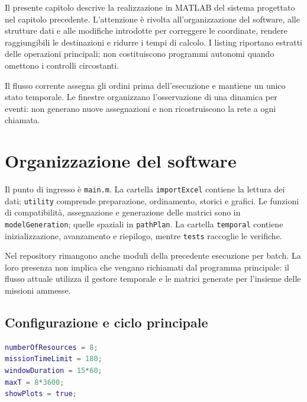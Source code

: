 
Il presente capitolo descrive la realizzazione in MATLAB del sistema
progettato nel capitolo precedente. L'attenzione è rivolta all'organizzazione
del software, alle strutture dati e alle modifiche introdotte per correggere
le coordinate, rendere raggiungibili le destinazioni e ridurre i tempi di
calcolo. I listing riportano estratti delle operazioni principali; non
costituiscono programmi autonomi quando omettono i controlli circostanti.

Il flusso corrente assegna gli ordini prima dell'esecuzione e mantiene
un unico stato temporale. Le finestre organizzano l'osservazione di una
dinamica per eventi: non generano nuove assegnazioni e non ricostruiscono
la rete a ogni chiamata.

\section{Organizzazione del software}
\label{sec:impl-organizzazione}

Il punto di ingresso è \texttt{main.m}. La cartella \texttt{importExcel}
contiene la lettura dei dati; \texttt{utility} comprende preparazione,
ordinamento, storici e grafici. Le funzioni di compatibilità, assegnazione
e generazione delle matrici sono in \texttt{modelGeneration}; quelle
spaziali in \texttt{pathPlan}. La cartella \texttt{temporal} contiene
inizializzazione, avanzamento e riepilogo, mentre \texttt{tests} raccoglie
le verifiche.

Nel repository rimangono anche moduli della precedente esecuzione per batch.
La loro presenza non implica che vengano richiamati dal programma principale:
il flusso attuale utilizza il gestore temporale e le matrici generate per
l'insieme delle missioni ammesse.

\subsection{Configurazione e ciclo principale}

\begin{lstlisting}[language=Matlab,caption={Configurazione corrente del simulatore.},label={lst:impl-parametri}]
numberOfResources = 8;
missionTimeLimit = 180;
windowDuration = 15*60;
maxT = 8*3600;
showPlots = true;
\end{lstlisting}

